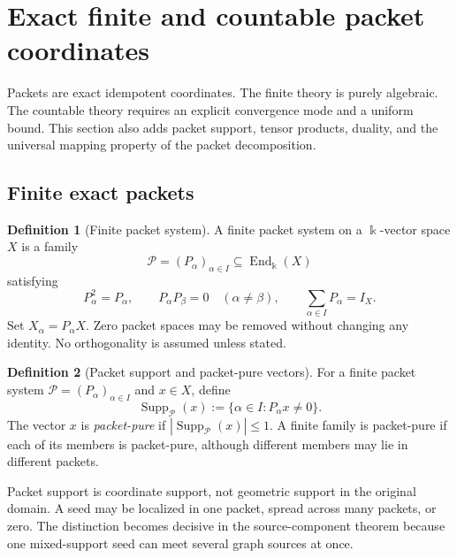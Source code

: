 \documentclass[11pt]{article}
\theoremstyle{definition}
\newtheorem{definition}[definition]{Definition}
\theoremstyle{remark}
\theoremstyle{definition}\newtheorem{example}[theorem]{Example}
\newcommand{\bbk}{\Bbbk}
\newcommand{\Pcal}{\mathcal P}
\newcommand{\End}{\operatorname{End}}
\newcommand{\Supp}{\operatorname{Supp}}
\newcommand{\RecordID}[1]{\label{record:#1}}
\begin{document}
\section{Exact finite and countable packet coordinates}



\begin{readerroadmap}
Packets are exact idempotent coordinates.  The finite theory is purely algebraic.  The countable theory requires an explicit convergence mode and a uniform bound.  This section also adds packet support, tensor products, duality, and the universal mapping property of the packet decomposition.
\end{readerroadmap}
\subsection{Finite exact packets}

\begin{definition}[Finite packet system]
\label{def:packet-system}
A finite packet system on a $\bbk$-vector space $X$ is a family
\[
\Pcal=(P_\alpha)_{\alpha\in I}\subseteq\End_{\bbk}(X)
\]
satisfying
\[
P_\alpha^2=P_\alpha,
\qquad
P_\alpha P_\beta=0\quad(\alpha\neq\beta),
\qquad
\sum_{\alpha\in I}P_\alpha=I_X.
\]
Set $X_\alpha=P_\alpha X$.  Zero packet spaces may be removed without changing any identity.  No orthogonality is assumed unless stated.
\end{definition}
\RecordID{PSC-I-D-PACKET-SYSTEM}

\begin{definition}[Packet support and packet-pure vectors]
\label{def:packet-support}
For a finite packet system \(\Pcal=(P_\alpha)_{\alpha\in I}\) and \(x\in X\), define
\[
\Supp_{\Pcal}(x)
:=
\{\alpha\in I:P_\alpha x\neq0\}.
\]
The vector \(x\) is \emph{packet-pure} if \(|\Supp_{\Pcal}(x)|\leq1\).  A finite family is packet-pure if each of its members is packet-pure, although different members may lie in different packets.
\end{definition}
\RecordID{PSC-I-D-PACKET-SUPPORT}

\begin{interpretation}
Packet support is coordinate support, not geometric support in the original domain.  A seed may be localized in one packet, spread across many packets, or zero.  The distinction becomes decisive in the source-component theorem because one mixed-support seed can meet several graph sources at once.
\end{interpretation}
\end{document}
